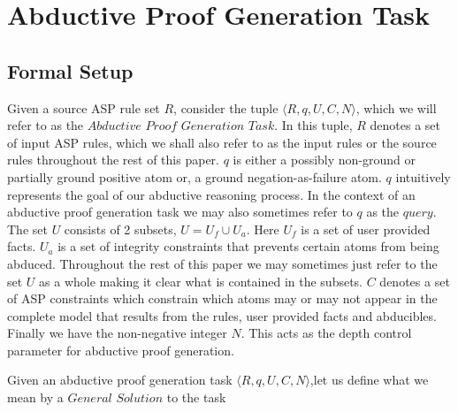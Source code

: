 \section{Abductive Proof Generation Task}\label{sec:abductive_proof}

\subsection{Formal Setup}\label{formalsetup}


\begin{definition}\label{def:abductive_proof_generation_task}

Given a source ASP rule set $R$, consider the tuple $\langle R,q,U,C,N \rangle$, which we will refer to as the $\textit{Abductive Proof Generation Task}$. In this tuple,  $R$ denotes a set of input ASP rules, which we shall also refer to as the input rules or the source rules throughout the rest of this paper. $q$ is either a possibly non-ground or partially ground positive atom or, a ground negation-as-failure atom. $q$ intuitively represents the goal of our abductive reasoning process. In the context of an abductive proof generation task we may also sometimes refer to $q$ as the $query$. 
The set $U$ consists of 2 subsets, $U = U_{f} \cup U_{a}$. Here $U_{f}$ is a set of user provided facts. $U_{a}$ is a set of integrity constraints that prevents certain atoms from being abduced. Throughout the rest of this paper we may sometimes just refer to the set $U$ as a whole making it clear what is contained in the subsets. $C$ denotes a set of ASP constraints which constrain which atoms may or may not appear in the complete model that results from the rules, user provided facts and abducibles. Finally we have the non-negative integer $N$. This acts as the depth control parameter for abductive proof generation. 
 \end{definition}
Given an abductive proof generation task $\langle R,q,U,C,N \rangle$,let us define what we mean by a $\textit{General Solution}$ to the task

